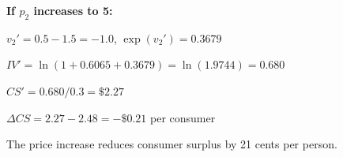 \documentclass[addpoints,answers]{exam}
\begin{document}
\begin{questions}
\begin{parts}
\begin{solution}
	\textbf{If $p_2$ increases to 5:}

	$v_2' = 0.5 - 1.5 = -1.0$, $\exp(v_2') = 0.3679$

	$IV' = \ln(1 + 0.6065 + 0.3679) = \ln(1.9744) = 0.680$

	$CS' = 0.680 / 0.3 = \$2.27$

	$\Delta CS = 2.27 - 2.48 = \boxed{-\$0.21}$ per consumer

	The price increase reduces consumer surplus by 21 cents per person.
	\end{solution}
\end{parts}

\end{questions}
\end{document}
